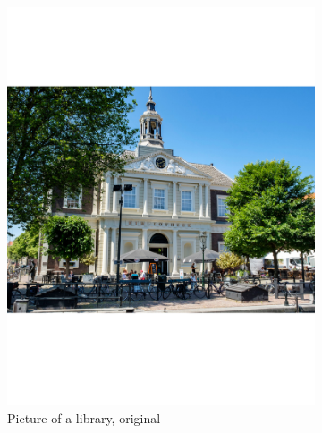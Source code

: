 \documentclass[a4paper]{article}
\begin{document}
\begin{figure}[H]
	\centering
	\begin{subfigure}{0.49\textwidth}
		\centering
		\includegraphics[trim={4cm 8cm 4cm 8cm},clip,width=1\textwidth]{Images/Bib.pdf}
		\caption{Picture of a library, original}
		\label{sub:Bib}
	\end{subfigure}
	\begin{subfigure}{0.49\textwidth}
	\centering

\end{subfigure}
\end{figure}
\end{document}
